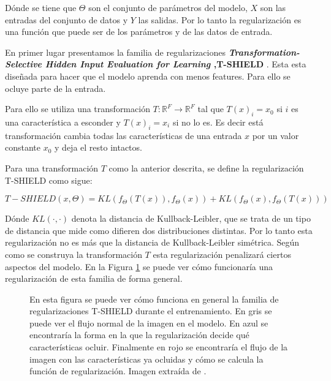 Dónde se tiene que $\Theta$ son el conjunto de parámetros del modelo, $X$ son las entradas del conjunto de datos y $Y$ las salidas. Por lo tanto la regularización es una función que puede ser de los parámetros y de las datos de entrada.

En primer lugar presentamos la familia de regularizaciones \textbf{\textit{Transformation-Selective Hidden Input Evaluation for Learning} ,T-SHIELD} \cite{XSHIELD}. Esta esta diseñada para hacer que el modelo aprenda con menos features. Para ello se ocluye parte de la entrada. 

Para ello se utiliza una transformación $T: \mathbb{R}^F \rightarrow \mathbb{R}^F$ tal que $T(x)_i = x_0$ si $i$ es una característica a esconder y $T(x)_i = x_i$ si no lo es. Es decir está transformación cambia todas las características de una entrada $x$ por un valor constante $x_0$ y deja el resto intactos.

Para una transformación $T$ como la anterior descrita, se define la regularización T-SHIELD como sigue:

\begin{equation}
T-SHIELD(x,\Theta) = KL(f_\Theta(T(x)),f_\Theta(x)) + KL(f_\Theta(x),f_\Theta(T(x))) 
\end{equation}

Dónde $KL(\cdot,\cdot)$ denota la distancia de Kullback-Leibler, que se trata de un tipo de distancia que mide como difieren dos distribuciones distintas. Por lo tanto esta regularización no es más que la distancia de Kullback-Leibler simétrica. Según como se construya la transformación $T$ esta regularización penalizará ciertos aspectos del modelo. En la Figura \ref{fig:tshield_flow} se puede ver cómo funcionaría una regularización de esta familia de forma general.

\begin{figure}[h]
\noindent
{}
\caption{ En esta figura se puede ver cómo funciona en general la familia de regularizaciones T-SHIELD durante el entrenamiento. En gris se puede ver el flujo normal de la imagen en el modelo. En azul se encontraría la forma en la que la regularización decide qué características ocluir. Finalmente en rojo se encontraría el flujo de la imagen con las características ya ocluidas y cómo se calcula la función de regularización. Imagen extraída de \cite{REVEL}.}
\label{fig:tshield_flow}
\end{figure}

